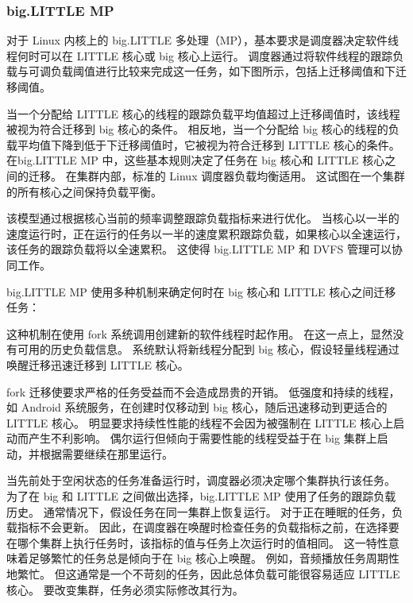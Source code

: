 \subsubsection{big.LITTLE MP}

对于 Linux 内核上的 big.LITTLE 多处理（MP），基本要求是调度器决定软件线程何时可以在 LITTLE 核心或 big 核心上运行。
调度器通过将软件线程的跟踪负载与可调负载阈值进行比较来完成这一任务，如下图所示，包括上迁移阈值和下迁移阈值。


当一个分配给 LITTLE 核心的线程的跟踪负载平均值超过上迁移阈值时，该线程被视为符合迁移到 big 核心的条件。
相反地，当一个分配给 big 核心的线程的负载平均值下降到低于下迁移阈值时，它被视为符合迁移到 LITTLE 核心的条件。
在big.LITTLE MP 中，这些基本规则决定了任务在 big 核心和 LITTLE 核心之间的迁移。
在集群内部，标准的 Linux 调度器负载均衡适用。
这试图在一个集群的所有核心之间保持负载平衡。

该模型通过根据核心当前的频率调整跟踪负载指标来进行优化。
当核心以一半的速度运行时，正在运行的任务以一半的速度累积跟踪负载，如果核心以全速运行，该任务的跟踪负载将以全速累积。
这使得 big.LITTLE MP 和 DVFS 管理可以协同工作。

big.LITTLE MP 使用多种机制来确定何时在 big 核心和 LITTLE 核心之间迁移任务：


这种机制在使用 fork 系统调用创建新的软件线程时起作用。
在这一点上，显然没有可用的历史负载信息。
系统默认将新线程分配到 big 核心，假设轻量线程通过唤醒迁移迅速迁移到 LITTLE 核心。

fork 迁移使要求严格的任务受益而不会造成昂贵的开销。
低强度和持续的线程，如 Android 系统服务，在创建时仅移动到 big 核心，随后迅速移动到更适合的 LITTLE 核心。
明显要求持续性性能的线程不会因为被强制在 LITTLE 核心上启动而产生不利影响。
偶尔运行但倾向于需要性能的线程受益于在 big 集群上启动，并根据需要继续在那里运行。


当先前处于空闲状态的任务准备运行时，调度器必须决定哪个集群执行该任务。
为了在 big 和 LITTLE 之间做出选择，big.LITTLE MP 使用了任务的跟踪负载历史。
通常情况下，假设任务在同一集群上恢复运行。
对于正在睡眠的任务，负载指标不会更新。
因此，在调度器在唤醒时检查任务的负载指标之前，在选择要在哪个集群上执行任务时，该指标的值与任务上次运行时的值相同。
这一特性意味着足够繁忙的任务总是倾向于在 big 核心上唤醒。
例如，音频播放任务周期性地繁忙。
但这通常是一个不苛刻的任务，因此总体负载可能很容易适应 LITTLE 核心。
要改变集群，任务必须实际修改其行为。

